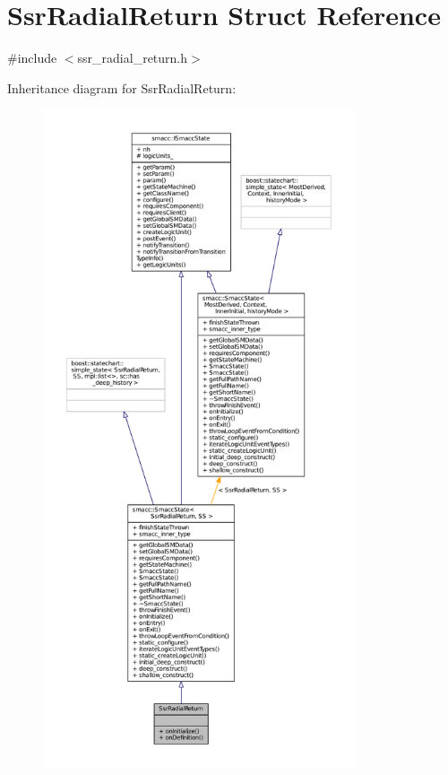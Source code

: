 \hypertarget{structSsrRadialReturn}{}\section{Ssr\+Radial\+Return Struct Reference}
\label{structSsrRadialReturn}


{\ttfamily \#include $<$ssr\+\_\+radial\+\_\+return.\+h$>$}



Inheritance diagram for Ssr\+Radial\+Return\+:
\nopagebreak
\begin{figure}[H]
\begin{center}
\leavevmode
\includegraphics[height=550pt]{structSsrRadialReturn__inherit__graph}
\end{center}
\end{figure}


